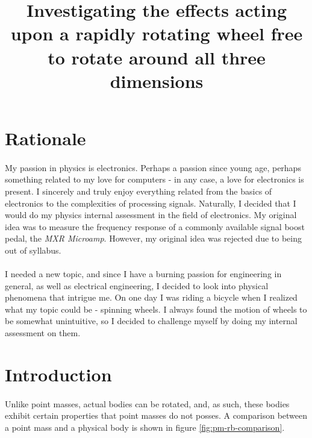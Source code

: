 \documentclass[a4paper]{article}
\begin{document}
\title{Investigating the effects acting upon a rapidly rotating wheel free to
rotate around all three dimensions}
\author{}
\date{}

\maketitle

\onehalfspacing

\section*{Rationale}

\paragraph*{}
My passion in physics is electronics. Perhaps a passion since young age,
perhaps something related to my love for computers - in any case, a love for
electronics is present. I sincerely and truly enjoy everything related from the
basics of electronics to the complexities of processing signals. Naturally, I
decided that I would do my physics internal assessment in the field of
electronics. My original idea was to measure the frequency response of a
commonly available signal boost pedal, the \textit{MXR Microamp}. However, my
original idea was rejected due to being out of syllabus.

\paragraph*{}
I needed a new topic, and since I have a burning passion for engineering in
general, as well as electrical engineering, I decided to look into physical
phenomena that intrigue me. On one day I was riding a bicycle when I realized
what my topic could be - spinning wheels. I always found the motion of wheels
to be somewhat unintuitive, so I decided to challenge myself by doing my
internal assessment on them.

\section{Introduction}

\paragraph*{}
Unlike point masses, actual bodies can be rotated, and, as such, these bodies
exhibit certain properties that point masses do not posses. A comparison
between a point mass and a physical body is shown in figure
\ref{fig:pm-rb-comparison}.
\end{document}

